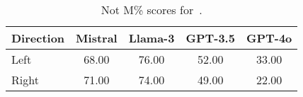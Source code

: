 \begin{table}[tb]
\small
\centering
\setlength{\tabcolsep}{2mm}
\begin{tabular}{l|cccc}
\toprule
\textbf{Direction}& \textbf{Mistral}& \textbf{Llama-3} & \textbf{GPT-3.5}& \textbf{GPT-4o} \\
\midrule[0.5pt]
Left &68.00&76.00&52.00&33.00\\

Right &71.00&74.00&49.00&22.00\\

\bottomrule
\end{tabular}
\caption{Not M\% scores for~.}
\vspace{-0.1in}
\label{tab:autoregressive_plus}
\end{table}